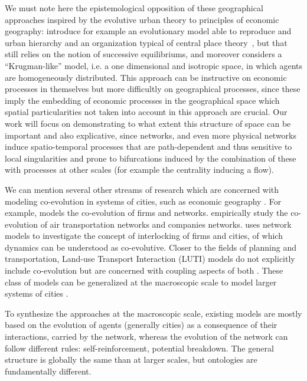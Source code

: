 \documentclass[11pt]{article}
\begin{document}
We must note here the epistemological opposition of these geographical approaches inspired by the evolutive urban theory \citep{pumain1997pour} to principles of economic geography: \cite{fujita1999evolution} introduce for example an evolutionary model able to reproduce and urban hierarchy and an organization typical of central place theory~\citep{banos2011christaller}, but that still relies on the notion of successive equilibriums, and moreover considers a ``Krugman-like'' model, i.e. a one dimensional and isotropic space, in which agents are homogeneously distributed. This approach can be instructive on economic processes in themselves but more difficultly on geographical processes, since these imply the embedding of economic processes in the geographical space which spatial particularities not taken into account in this approach are crucial. Our work will focus on demonstrating to what extent this structure of space can be important and also explicative, since networks, and even more physical networks induce spatio-temporal processes that are path-dependent and thus sensitive to local singularities and prone to bifurcations induced by the combination of these with processes at other scales (for example the centrality inducing a flow).


We can mention several other streams of research which are concerned with modeling co-evolution in systems of cities, such as economic geography \citep{schamp201020}. For example, \cite{doi:10.1080/00343400802662658} models the co-evolution of firms and networks. \cite{liu2013exploring} empirically study the co-evolution of air transportation networks and companies networks. \cite{neal2012structural} uses network models to investigate the concept of interlocking of firms and cities, of which dynamics can be understood as co-evolutive. Closer to the fields of planning and transportation, Land-use Transport Interaction (LUTI) models do not explicitly include co-evolution but are concerned with coupling aspects of both \citep{wegener2004land}. These class of models can be generalized at the macroscopic scale to model larger systems of cities \citep{russo2012unifying}.


To synthesize the approaches at the macroscopic scale, existing models are mostly based on the evolution of agents (generally cities) as a consequence of their interactions, carried by the network, whereas the evolution of the network can follow different rules: self-reinforcement, potential breakdown. The general structure is globally the same than at larger scales, but ontologies are fundamentally different.
\end{document}
